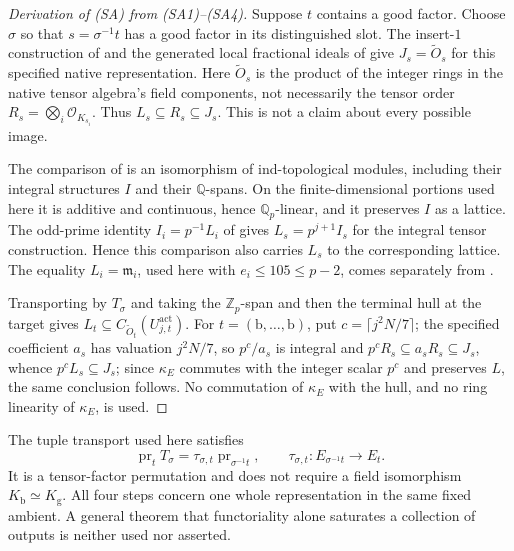\documentclass[11pt]{article}
\theoremstyle{plain}
\theoremstyle{definition}
\newcommand{\SA}{\textup{(SA)}}
\begin{document}
\begin{proof}[Derivation of \SA{} from (SA1)--(SA4)]
Suppose $t$ contains a good factor.  Choose $\sigma$ so that
$s=\sigma^{-1}t$ has a good factor in its distinguished slot.  The insert-$1$
construction of \cite[Propositions 3.1(ii), 3.4(i),(ii)]{IUT3} and the generated
local fractional ideals of \cite[Example 3.6(ii), Proposition 3.7(v),
Definition 3.8(i)]{IUT3} give $J_s=\widetilde O_s$ for this specified native
representation.  Here $\widetilde O_s$ is the product of the integer rings in
the native tensor algebra's field components, not necessarily the tensor
order $R_s=\bigotimes_i\mathcal O_{K_{s_i}}$.  Thus
$L_s\subseteq R_s\subseteq J_s$.  This is not a claim about every possible image.

The comparison of \cite[Theorem 3.11(ii)(a), Proposition 3.2(i),(ii)]{IUT3}
is an isomorphism of ind-topological modules, including their integral
structures $I$ and their $\mathbb{Q}$-spans.  On the finite-dimensional
portions used here it is additive and continuous, hence $\mathbb{Q}_p$-linear,
and it preserves $I$ as a lattice.  The odd-prime identity
$I_i=p^{-1}L_i$ of \cite[Remark 1.2.2(i)]{IUT3} gives
$L_s=p^{j+1}I_s$ for the integral tensor construction.  Hence this comparison
also carries $L_s$ to the corresponding lattice.  The equality
$L_i=\mathfrak m_i$, used here with $e_i\le105\le p-2$, comes separately from
\cite[Proposition 1.2(i)]{IUT4}.

Transporting by
$T_\sigma$ and taking the $\mathbb{Z}_p$-span and then the terminal hull at the
target gives $L_t\subseteq C_{\widetilde O_t}(U^{\mathrm{act}}_{j,t})$.  For
$t=(\mathrm{b},\dots,\mathrm{b})$, put $c=\lceil j^2N/7\rceil$; the specified
coefficient $a_s$ has valuation $j^2N/7$, so $p^c/a_s$ is integral and
$p^cR_s\subseteq a_sR_s\subseteq J_s$, whence $p^cL_s\subseteq J_s$; since
$\kappa_E$ commutes with the integer scalar $p^c$ and preserves $L$, the same
conclusion follows.  No commutation of $\kappa_E$ with the hull, and no ring
linearity of $\kappa_E$, is used.
\end{proof}

The tuple transport used here satisfies
\[
 \operatorname{pr}_tT_\sigma
 =\tau_{\sigma,t}\operatorname{pr}_{\sigma^{-1}t},\qquad
 \tau_{\sigma,t}:E_{\sigma^{-1}t}\longrightarrow E_t.
\]
It is a tensor-factor permutation and does not require a field isomorphism
$K_{\mathrm b}\simeq K_{\mathrm g}$.  All four steps concern one whole
representation in the same fixed ambient.  A general theorem that functoriality
alone saturates a collection of outputs is neither used nor asserted.
\end{document}
